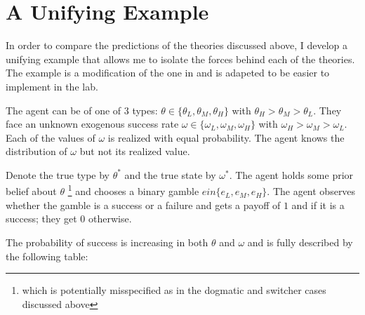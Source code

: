 \documentclass[
  12pt,
]{article}
\begin{document}
\hypertarget{a-unifying-example}{%
\section{A Unifying Example}\label{a-unifying-example}}

In order to compare the predictions of the theories discussed above, I
develop a unifying example that allows me to isolate the forces behind
each of the theories. The example is a modification of the one in
\citet{Heidhues2018} and is adapeted to be easier to implement in the
lab.

The agent can be of one of 3 types:
\(\theta \in \{\theta_L, \theta_M, \theta_H\}\) with
\(\theta_H > \theta_M > \theta_L\). They face an unknown exogenous
success rate \(\omega \in \{\omega_L, \omega_M, \omega_H\}\) with
\(\omega_H>\omega_M>\omega_L\). Each of the values of \(\omega\) is
realized with equal probability. The agent knows the distribution of
\(\omega\) but not its realized value.

Denote the true type by \(\theta^*\) and the true state by \(\omega^*\).
The agent holds some prior belief about \(\theta\)
\footnote{which is potentially misspecified as in the dogmatic and switcher cases discussed above}
and chooses a binary gamble \(e in \{e_L, e_M, e_H\}\). The agent
observes whether the gamble is a success or a failure and gets a payoff
of \(1\) and if it is a success; they get \(0\) otherwise.

The probability of success is increasing in both \(\theta\) and
\(\omega\) and is fully described by the following table:
\end{document}
